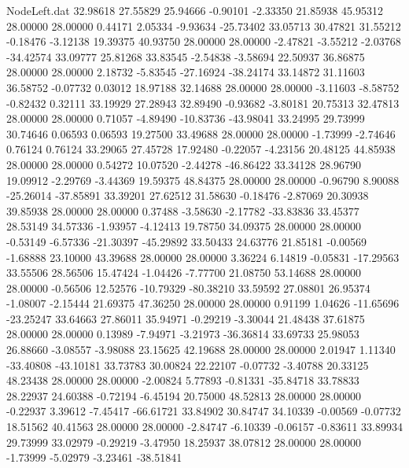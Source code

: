 \begin{filecontents}{NodeLeft.dat}
  32.98618   27.55829   25.94666    -0.90101   -2.33350   21.85938   45.95312   28.00000   28.00000    0.44171    2.05334   -9.93634  -25.73402
  33.05713   30.47821   31.55212    -0.18476   -3.12138   19.39375   40.93750   28.00000   28.00000   -2.47821   -3.55212   -2.03768  -34.42574
  33.09777   25.81268   33.83545    -2.54838   -3.58694   22.50937   36.86875   28.00000   28.00000    2.18732   -5.83545  -27.16924  -38.24174
  33.14872   31.11603   36.58752    -0.07732    0.03012   18.97188   32.14688   28.00000   28.00000   -3.11603   -8.58752   -0.82432    0.32111
  33.19929   27.28943   32.89490    -0.93682   -3.80181   20.75313   32.47813   28.00000   28.00000    0.71057   -4.89490  -10.83736  -43.98041
  33.24995   29.73999   30.74646     0.06593    0.06593   19.27500   33.49688   28.00000   28.00000   -1.73999   -2.74646    0.76124    0.76124
  33.29065   27.45728   17.92480    -0.22057   -4.23156   20.48125   44.85938   28.00000   28.00000    0.54272   10.07520   -2.44278  -46.86422
  33.34128   28.96790   19.09912    -2.29769   -3.44369   19.59375   48.84375   28.00000   28.00000   -0.96790    8.90088  -25.26014  -37.85891
  33.39201   27.62512   31.58630    -0.18476   -2.87069   20.30938   39.85938   28.00000   28.00000    0.37488   -3.58630   -2.17782  -33.83836
  33.45377   28.53149   34.57336    -1.93957   -4.12413   19.78750   34.09375   28.00000   28.00000   -0.53149   -6.57336  -21.30397  -45.29892
  33.50433   24.63776   21.85181    -0.00569   -1.68888   23.10000   43.39688   28.00000   28.00000    3.36224    6.14819   -0.05831  -17.29563
  33.55506   28.56506   15.47424    -1.04426   -7.77700   21.08750   53.14688   28.00000   28.00000   -0.56506   12.52576  -10.79329  -80.38210
  33.59592   27.08801   26.95374    -1.08007   -2.15444   21.69375   47.36250   28.00000   28.00000    0.91199    1.04626  -11.65696  -23.25247
  33.64663   27.86011   35.94971    -0.29219   -3.30044   21.48438   37.61875   28.00000   28.00000    0.13989   -7.94971   -3.21973  -36.36814
  33.69733   25.98053   26.88660    -3.08557   -3.98088   23.15625   42.19688   28.00000   28.00000    2.01947    1.11340  -33.40808  -43.10181
  33.73783   30.00824   22.22107    -0.07732   -3.40788   20.33125   48.23438   28.00000   28.00000   -2.00824    5.77893   -0.81331  -35.84718
  33.78833   28.22937   24.60388    -0.72194   -6.45194   20.75000   48.52813   28.00000   28.00000   -0.22937    3.39612   -7.45417  -66.61721
  33.84902   30.84747   34.10339    -0.00569   -0.07732   18.51562   40.41563   28.00000   28.00000   -2.84747   -6.10339   -0.06157   -0.83611
  33.89934   29.73999   33.02979    -0.29219   -3.47950   18.25937   38.07812   28.00000   28.00000   -1.73999   -5.02979   -3.23461  -38.51841

\end{filecontents}
